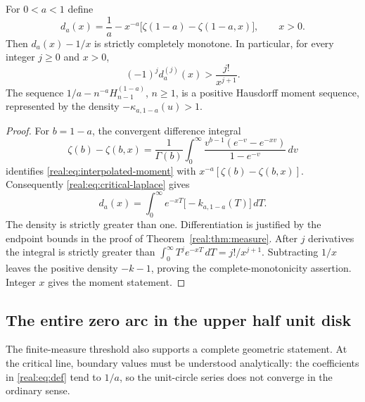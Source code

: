 \begin{corollary}
\label{real:cor:deficit}
For $0<a<1$ define
\begin{equation}\label{real:eq:deficit}
 d_a(x)=\frac1a-x^{-a}
       \bigl[\zeta(1-a)-\zeta(1-a,x)\bigr],\qquad x>0.
\end{equation}
Then $d_a(x)-1/x$ is strictly completely monotone. In particular, for
every integer $j\geq0$ and $x>0$,
\begin{equation}\label{real:eq:deficit-bound}
 (-1)^j d_a^{(j)}(x)>\frac{j!}{x^{j+1}}.
\end{equation}
The sequence $1/a-n^{-a}H_{n-1}^{(1-a)}$, $n\geq1$, is a positive
Hausdorff moment sequence, represented by the density
$-\kappa_{a,1-a}(u)>1$.
\end{corollary}
\begin{proof}
For $b=1-a$, the convergent difference integral
\[
 \zeta(b)-\zeta(b,x)
 =\frac1{\Gamma(b)}\int_0^\infty
  \frac{v^{b-1}(e^{-v}-e^{-xv})}{1-e^{-v}}\,dv
\]
identifies \eqref{real:eq:interpolated-moment} with
$x^{-a}[\zeta(b)-\zeta(b,x)]$.
Consequently \eqref{real:eq:critical-laplace} gives
\[
 d_a(x)=\int_0^\infty e^{-xT}\bigl[-k_{a,1-a}(T)\bigr]\,dT.
\]
The density is strictly greater than one. Differentiation is justified
by the endpoint bounds in the proof of Theorem~\ref{real:thm:measure}.
After $j$ derivatives the integral is strictly greater than
$\int_0^\infty T^j e^{-xT}\,dT=j!/x^{j+1}$.
Subtracting $1/x$ leaves the positive density $-k-1$, proving the
complete-monotonicity assertion. Integer $x$ gives the moment statement.
\end{proof}

\subsection{The entire zero arc in the upper half unit disk}

The finite-measure threshold also supports a complete geometric
statement. At the critical line, boundary values must be understood
analytically: the coefficients in \eqref{real:eq:def} tend to $1/a$,
so the unit-circle series does not converge in the ordinary sense.

